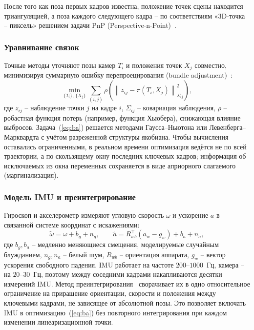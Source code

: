     После того как поза первых кадров известна, положение точек сцены находится триангуляцией, а поза каждого следующего кадра -- по соответствиям «3D-точка -- пиксель» решением задачи PnP (Perspective-n-Point)~\cite{hartley_zisserman}.

    \subsubsection{Уравнивание связок}
    Точные методы уточняют позы камер $T_i$ и положения точек $X_j$ совместно, минимизируя суммарную ошибку перепроецирования (bundle adjustment)~\cite{bundle_adjustment}:
    \begin{equation}\label{eq:ba}
        \min_{\{T_i\},\, \{X_j\}} \sum_{(i,j)} \rho\!\left( \left\| z_{ij} - \pi(T_i, X_j) \right\|^2_{\Sigma_{ij}} \right),
    \end{equation}
    где $z_{ij}$ -- наблюдение точки $j$ на кадре $i$, $\Sigma_{ij}$ -- ковариация наблюдения, $\rho$ -- робастная функция потерь (например, функция Хьюбера), снижающая влияние выбросов.
    Задача~(\ref{eq:ba}) решается методами Гаусса--Ньютона или Левенберга--Марквардта с учётом разреженной структуры якобиана.
    Чтобы вычисления оставались ограниченными, в реальном времени оптимизация ведётся не по всей траектории, а по скользящему окну последних ключевых кадров; информация об исключаемых из окна переменных сохраняется в виде априорного слагаемого (маргинализация).

    \subsubsection{Модель IMU и преинтегрирование}
    Гироскоп и акселерометр измеряют угловую скорость $\omega$ и ускорение $a$ в связанной системе координат с искажениями:
    \begin{equation}\label{eq:imu}
        \tilde{\omega} = \omega + b_g + n_g, \qquad
        \tilde{a} = R_{wb}^\top \left( a_w - g_w \right) + b_a + n_a ,
    \end{equation}
    где $b_g, b_a$ -- медленно меняющиеся смещения, моделируемые случайным блужданием, $n_g, n_a$ -- белый шум, $R_{wb}$ -- ориентация аппарата, $g_w$ -- вектор ускорения свободного падения.
    IMU работает на частоте $200$--$1000$~Гц, камера -- на $20$--$30$~Гц, поэтому между соседними кадрами накапливаются десятки измерений IMU.
    Метод преинтегрирования~\cite{preintegration} сворачивает их в одно относительное ограничение на приращение ориентации, скорости и положения между ключевыми кадрами, не зависящее от абсолютной позы.
    Это позволяет включать IMU в оптимизацию~(\ref{eq:ba}) без повторного интегрирования при каждом изменении линеаризационной точки.

